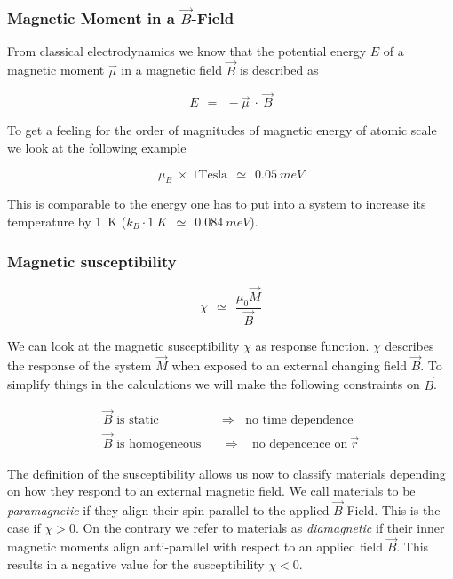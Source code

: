 \documentclass[10pt]{report}
\numberwithin{equation}{chapter}
\begin{document}
\subsubsection{Magnetic Moment in a $\vec{B}$-Field}


From classical electrodynamics we know that the potential energy $E$ of a magnetic moment $\vec{\mu}$ in a magnetic field $\vec{B}$ is described as

\begin{equation}
  E ~~=~~ - \vec{\mu} ~\cdot~ \vec{B}
\end{equation}

To get a feeling for the order of magnitudes of magnetic energy of atomic scale we look at the following example

\begin{equation*}
  \mu_B ~\times~ 1 \text{Tesla} ~~\simeq~~ \SI{0.05}{meV}
\end{equation*}

This is comparable to the energy one has to put into a system to increase its temperature by \SI[mode=text]{1}{K} ($ k_B \cdot \SI{1}{K} ~~\simeq~~ \SI{0.084}{meV}$).


\subsubsection{Magnetic susceptibility}

\begin{equation} \label{eq:mag_suscept}
  \chi ~~≃~~ \frac{\mu_0 \vec{M}}{\vec{B}}
\end{equation}

We can look at the magnetic susceptibility $\chi$ as response function. $\chi$ describes the response of the system $\vec{M}$ when exposed to an external changing field $\vec{B}$.
To simplify things in the calculations we will make the following constraints on $\vec{B}$.

\begin{align*}
  \vec{B} \text{ is static} ~~~~ &  \Rightarrow  ~~~~ \text{no time dependence}\\
  \vec{B} \text{ is homogeneous} ~~~~ & \Rightarrow  ~~~~ \text{no depencence on}\ \vec{r}
\end{align*}


The definition of the susceptibility allows us now to classify materials depending on how they respond to an external magnetic field. We call materials to be \textit{paramagnetic} if they align their spin parallel to the applied $\vec{B}$-Field. This is the case if $\chi > 0$. On the contrary we refer to materials as \textit{diamagnetic} if their inner magnetic moments align anti-parallel with respect to an applied field $\vec{B}$. This results in a negative value for the susceptibility $\chi < 0$.
\end{document}
